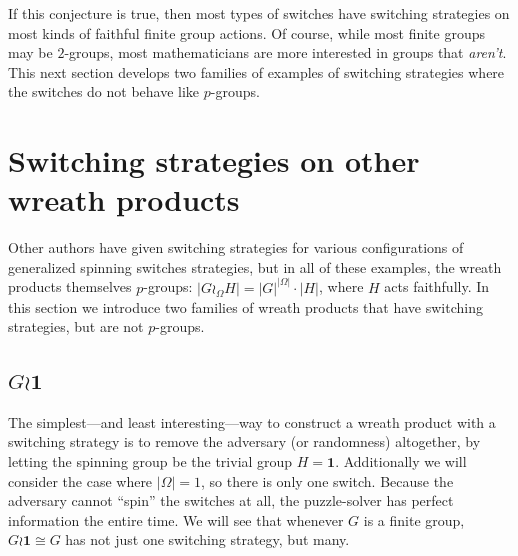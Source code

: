 If this conjecture is true, then most types of switches have switching
strategies on most kinds of faithful finite group actions.
Of course, while most finite groups may be $2$-groups, most mathematicians
are more interested in groups that \textit{aren't}.
This next section develops two families of examples of switching strategies
where the switches do not behave like $p$-groups.

%
%
\section{Switching strategies on other wreath products}
\label{sec:OtherSwitchingStrategies}

Other authors have given switching strategies for various configurations of
generalized spinning switches strategies, but in all of these examples,
the wreath products themselves $p$-groups:
$|G \wr_\Omega H| = |G|^{|\Omega|} \cdot |H|$, where $H$ acts faithfully.
In this section we introduce two families of wreath products that have switching
strategies, but are not $p$-groups.

\subsection{\texorpdfstring{$G \wr \mathbf{1}$}{The trivial wreath product}}
The simplest---and least interesting---way to construct a wreath product with
a switching strategy is to remove the adversary (or randomness) altogether,
by letting the spinning group be the trivial group $H = \mathbf{1}$.
Additionally we will consider the case where $|\Omega| = 1$, so there is only
one switch.
Because the adversary cannot ``spin'' the switches at all, the puzzle-solver has
perfect information the entire time.
We will see that whenever $G$ is a finite group,
$G \wr \mathbf{1} \cong G$ has not just one switching strategy, but many.


